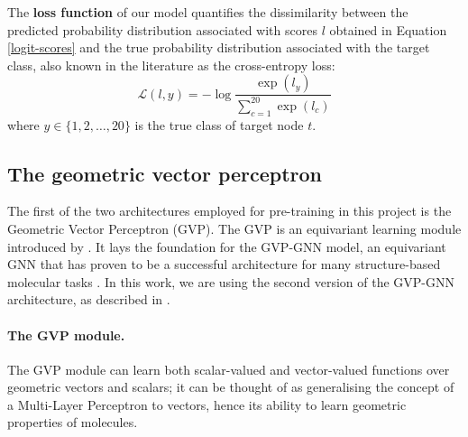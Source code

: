 The \textbf{loss function} of our model quantifies the dissimilarity between the predicted probability distribution associated with scores $l$ obtained in Equation \ref{logit-scores} and the true probability distribution associated with the target class, also known in the literature as the cross-entropy loss:
\begin{equation}
    \mathcal{L}(l, y) = -\log\frac{\exp({l_y})}{\sum_{c=1}^{20} \exp({l_c})}
\label{logits}
\end{equation}
where $y \in \{1,2,\dots,20\}$ is the true class of target node $t$.
\subsection{The geometric vector perceptron}
\label{the-gvp-math}
The first of the two architectures employed for pre-training in this project is the Geometric Vector Perceptron (GVP). The GVP is an equivariant learning module introduced by \citet{gvp1}. It lays the foundation for the GVP-GNN model, an equivariant GNN that has proven to be a successful architecture for many structure-based molecular tasks \cite{gvp1, gvp2}. In this work, we are using the second version of the GVP-GNN architecture, as described in \citet{gvp2}. 

\paragraph{The GVP module.}
The GVP module can learn both scalar-valued and vector-valued functions over geometric vectors and scalars; it can be thought of as generalising the concept of a Multi-Layer Perceptron to vectors, hence its ability to learn geometric properties of molecules. 

